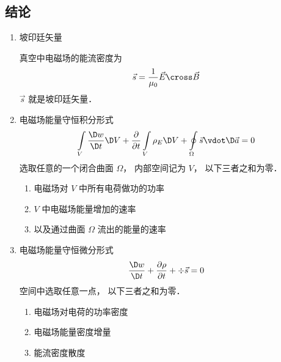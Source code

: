 



\subsection{结论}
\begin{enumerate}
\item 坡印廷矢量

真空中电磁场的能流密度为
\begin{equation}
\vec s = \frac{1}{{{\mu _0}}}\vec E \cross \vec B
\end{equation} 
 $\vec s$ 就是坡印廷矢量．


\item 电磁场能量守恒积分形式
\begin{equation}
\int\limits_V {\frac{{\D w}}{{\D t}}\D V}  + \frac{\partial }{{\partial t}}\int\limits_V {{\rho _E}\D V}  + \oint\limits_\Omega  {\vec s \vdot \D \vec a}  = 0
\end{equation} 
选取任意的一个闭合曲面 $\Omega $， 内部空间记为 $V$， 以下三者之和为零．
\begin{enumerate}
\item 电磁场对 $V$ 中所有电荷做功的功率
\item $V$ 中电磁场能量增加的速率
\item 以及通过曲面 $\Omega $ 流出的能量的速率
\end{enumerate}

\item 电磁场能量守恒微分形式
\begin{equation}
\frac{{\D w}}{{\D t}} + \frac{{\partial \rho }}{{\partial t}} + \div \vec s = 0
\end{equation} 
空间中选取任意一点， 以下三者之和为零．
\begin{enumerate}
\item 电磁场对电荷的功率密度
\item 电磁场能量密度增量
\item 能流密度散度
\end{enumerate}
\end{enumerate}

